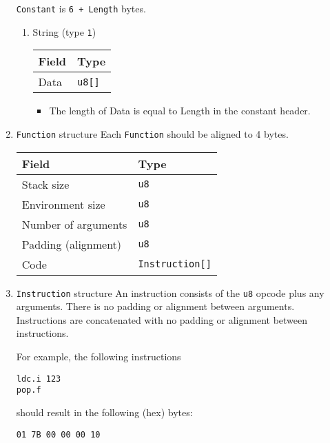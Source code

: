 \documentclass[11pt]{article}
\begin{document}
\begin{enumerate}
\texttt{Constant} is \texttt{6 + Length} bytes.

\begin{enumerate}
\item String (type \texttt{1})
\label{sec:orge15c666}
\begin{center}
\begin{tabular}{ll}
Field & Type\\
\hline
Data & \texttt{u8[]}\\
\end{tabular}
\end{center}

\begin{itemize}
\item The length of Data is equal to Length in the constant header.
\end{itemize}
\end{enumerate}

\item \texttt{Function} structure
\label{sec:orgeccc7c7}
Each \texttt{Function} should be aligned to 4 bytes.

\begin{center}
\begin{tabular}{ll}
Field & Type\\
\hline
Stack size & \texttt{u8}\\
Environment size & \texttt{u8}\\
Number of arguments & \texttt{u8}\\
Padding (alignment) & \texttt{u8}\\
Code & \texttt{Instruction[]}\\
\end{tabular}
\end{center}

\item \texttt{Instruction} structure
\label{sec:org4132fac}
An instruction consists of the \texttt{u8} opcode plus any arguments. There is
no padding or alignment between arguments. Instructions are concatenated
with no padding or alignment between instructions.

For example, the following instructions

\begin{verbatim}
ldc.i 123
pop.f
\end{verbatim}

should result in the following (hex) bytes:

\texttt{01 7B 00 00 00 10}
\end{enumerate}
\end{document}
